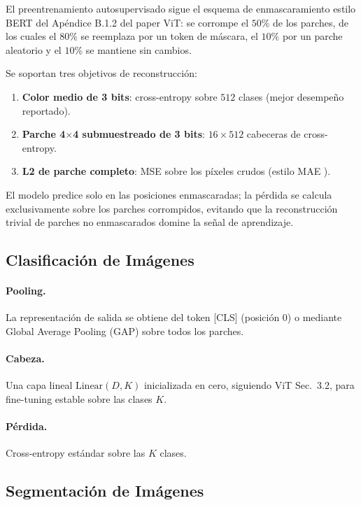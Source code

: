 El preentrenamiento autosupervisado sigue el esquema de enmascaramiento estilo BERT del Apéndice B.1.2 del paper ViT: se corrompe el $50\%$ de los parches, de los cuales el $80\%$ se reemplaza por un token de máscara, el $10\%$ por un parche aleatorio y el $10\%$ se mantiene sin cambios.

Se soportan tres objetivos de reconstrucción:
\begin{enumerate}[leftmargin=*]
    \item \textbf{Color medio de 3 bits}: cross-entropy sobre $512$ clases (mejor desempeño reportado).
    \item \textbf{Parche 4$\times$4 submuestreado de 3 bits}: $16 \times 512$ cabeceras de cross-entropy.
    \item \textbf{L2 de parche completo}: MSE sobre los píxeles crudos (estilo MAE \citep{he2022mae}).
\end{enumerate}

El modelo predice solo en las posiciones enmascaradas; la pérdida se calcula exclusivamente sobre los parches corrompidos, evitando que la reconstrucción trivial de parches no enmascarados domine la señal de aprendizaje.

\subsection{Clasificación de Imágenes}

\paragraph{Pooling.}
La representación de salida se obtiene del token [CLS] (posición 0) o mediante Global Average Pooling (GAP) sobre todos los parches.

\paragraph{Cabeza.}
Una capa lineal $\text{Linear}(D, K)$ inicializada en cero, siguiendo ViT Sec.~3.2, para fine-tuning estable sobre las clases $K$.

\paragraph{Pérdida.}
Cross-entropy estándar sobre las $K$ clases.

\subsection{Segmentación de Imágenes}

